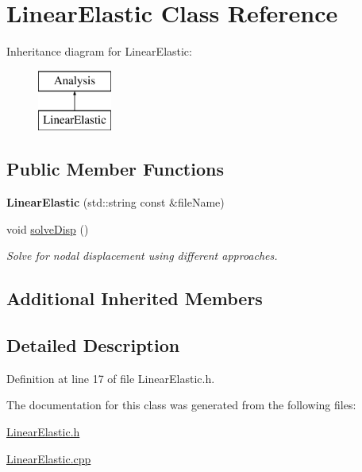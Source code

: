 \hypertarget{class_linear_elastic}{}\section{Linear\+Elastic Class Reference}
\label{class_linear_elastic}
Inheritance diagram for Linear\+Elastic\+:\begin{figure}[H]
\begin{center}
\leavevmode
\includegraphics[height=2.000000cm]{class_linear_elastic}
\end{center}
\end{figure}
\subsection*{Public Member Functions}
\begin{DoxyCompactItemize}
\item 
\mbox{\label{class_linear_elastic_af1b56916522c2f91f4f6e817ed63cfbe}} 
{\bfseries Linear\+Elastic} (std\+::string const \&file\+Name)
\item 
\mbox{\label{class_linear_elastic_add96aa6fdb7cbbbcef2dca1f31ca0779}} 
void \mbox{\hyperlink{class_linear_elastic_add96aa6fdb7cbbbcef2dca1f31ca0779}{solve\+Disp}} ()
\begin{DoxyCompactList}\small\item\em Solve for nodal displacement using different approaches. \end{DoxyCompactList}\end{DoxyCompactItemize}
\subsection*{Additional Inherited Members}


\subsection{Detailed Description}


Definition at line 17 of file Linear\+Elastic.\+h.



The documentation for this class was generated from the following files\+:\begin{DoxyCompactItemize}
\item 
\mbox{\hyperlink{_linear_elastic_8h}{Linear\+Elastic.\+h}}\item 
\mbox{\hyperlink{_linear_elastic_8cpp}{Linear\+Elastic.\+cpp}}\end{DoxyCompactItemize}
